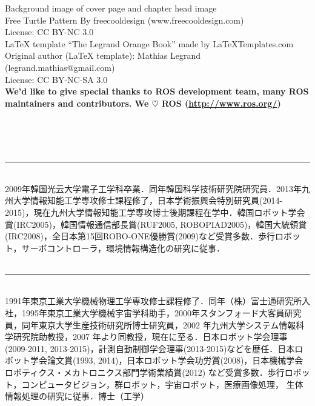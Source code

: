 \documentclass[11pt,fleqn]{book} %
\begin{document}
\noindent Background image of cover page and chapter head image\\
Free Turtle Pattern By freecooldesign (www.freecooldesign.com)\\
License: CC BY-NC 3.0\\

\noindent LaTeX template ``The Legrand Orange Book'' made by LaTeXTemplates.com\\
Original author (LaTeX template): Mathias Legrand (legrand.mathias@gmail.com)\\
License: CC BY-NC-SA 3.0\\

\noindent \textbf{We'd like to give special thanks to ROS development team, many ROS maintainers and contributors. We $\heartsuit$ ROS (\url{http://www.ros.org/})}

\newpage
\linespread{1.3}
\thispagestyle{empty}

\noindent{\LARGE [著者プロフィール]}\\
\\
\\
\noindent\rule{7cm}{1pt}\\
\normalsize
2009年韓国光云大学電子工学科卒業．同年韓国科学技術研究院研究員．2013年九州大学情報知能工学専攻修士課程修了，日本学術振興会特別研究員(2014-2015)，現在九州大学情報知能工学専攻博士後期課程在学中．韓国ロボット学会賞(IRC2005)，韓国情報通信部長賞(RUF2005, ROBOPIAD2005)，韓国大統領賞(IRC2008)，全日本第15回ROBO-ONE優勝賞(2009)など受賞多数．歩行ロボット，サーボコントローラ，環境情報構造化の研究に従事．\\

\\
\noindent\rule{7cm}{1pt}\\
\normalsize
1991年東京工業大学機械物理工学専攻修士課程修了．同年（株）富士通研究所入社，1995年東京工業大学機械宇宙学科助手，2000年スタンフォード大客員研究員，同年東京大学生産技術研究所博士研究員，2002 年九州大学システム情報科学研究院助教授，2007 年より同教授，現在に至る．日本ロボット学会理事(2009-2011, 2013-2015)，計測自動制御学会理事(2013-2015)などを歴任．日本ロボット学会論文賞(1993, 2014)，日本ロボット学会功労賞(2008)，日本機械学会ロボティクス・メカトロニクス部門学術業績賞(2012) など受賞多数．歩行ロボット，コンピュータビジョン，群ロボット，宇宙ロボット，医療画像処理， 生体情報処理の研究に従事．博士（工学）\\
\end{document}

